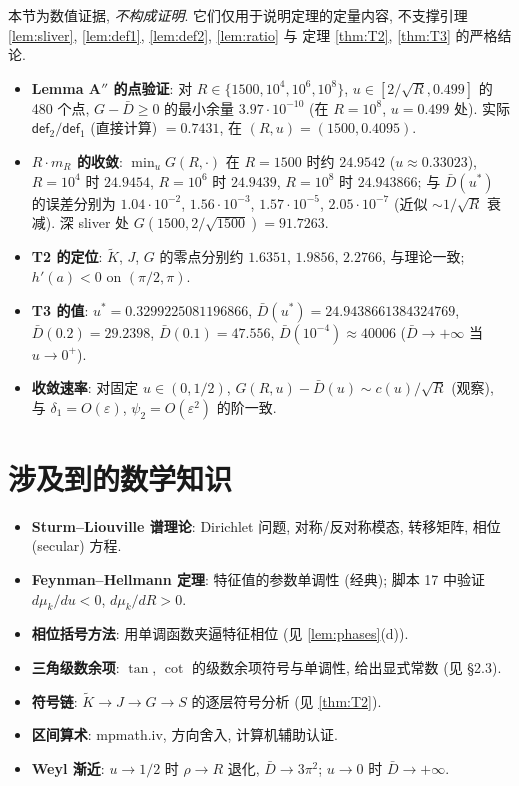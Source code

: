\documentclass[UTF8]{ctexart}
\begin{document}
本节为数值证据, \emph{不构成证明}. 它们仅用于说明定理的定量内容,
不支撑引理 \ref{lem:sliver}, \ref{lem:def1}, \ref{lem:def2}, \ref{lem:ratio} 与
定理 \ref{thm:T2}, \ref{thm:T3} 的严格结论.

\begin{itemize}
	\item \textbf{Lemma A$''$ 的点验证}: 对 $R\in\{1500,10^4,10^6,10^8\}$,
		$u\in[2/\sqrt R,0.499]$ 的 480 个点, $G-\bar D\ge0$ 的最小余量
		$3.97\cdot10^{-10}$ (在 $R=10^8$, $u=0.499$ 处). 实际
		$\mathsf{def}_2/\mathsf{def}_1$ (直接计算) $=0.7431$, 在 $(R,u)=(1500,0.4095)$.
	\item \textbf{$R\cdot m_R$ 的收敛}: $\min_u G(R,\cdot)$ 在 $R=1500$ 时约
		$24.9542$ ($u\approx0.33023$), $R=10^4$ 时 $24.9454$, $R=10^6$ 时 $24.9439$,
		$R=10^8$ 时 $24.943866$; 与 $\bar D(u^*)$ 的误差分别为 $1.04\cdot10^{-2}$,
		$1.56\cdot10^{-3}$, $1.57\cdot10^{-5}$, $2.05\cdot10^{-7}$
		(近似 $\sim1/\sqrt R$ 衰减). 深 sliver 处 $G(1500,2/\sqrt{1500})=91.7263$.
	\item \textbf{T2 的定位}: $\widetilde K$, $J$, $G$ 的零点分别约 $1.6351$, $1.9856$, $2.2766$,
		与理论一致; $h'(a)<0$ on $(\pi/2,\pi)$.
	\item \textbf{T3 的值}: $u^*=0.3299225081196866$, $\bar D(u^*)=24.9438661384324769$,
		$\bar D(0.2)=29.2398$, $\bar D(0.1)=47.556$, $\bar D(10^{-4})\approx40006$
		($\bar D\to+\infty$ 当 $u\to0^+$).
	\item \textbf{收敛速率}: 对固定 $u\in(0,1/2)$, $G(R,u)-\bar D(u)\sim c(u)/\sqrt R$
		(观察), 与 $\delta_1=O(\varepsilon)$, $\psi_2=O(\varepsilon^2)$ 的阶一致.
\end{itemize}

\section{涉及到的数学知识}
\begin{itemize}
	\item \textbf{Sturm--Liouville 谱理论}: Dirichlet 问题, 对称/反对称模态,
		转移矩阵, 相位 (secular) 方程.
	\item \textbf{Feynman--Hellmann 定理}: 特征值的参数单调性 (经典);
		脚本 17 中验证 $d\mu_k/du<0$, $d\mu_k/dR>0$.
	\item \textbf{相位括号方法}: 用单调函数夹逼特征相位 (见 \ref{lem:phases}(d)).
	\item \textbf{三角级数余项}: $\tan$, $\cot$ 的级数余项符号与单调性,
		给出显式常数 (见 §2.3).
	\item \textbf{符号链}: $\widetilde K\to J\to G\to S$ 的逐层符号分析
		(见 \ref{thm:T2}).
	\item \textbf{区间算术}: mpmath.iv, 方向舍入, 计算机辅助认证.
	\item \textbf{Weyl 渐近}: $u\to1/2$ 时 $\rho\to R$ 退化, $\bar D\to3\pi^2$;
		$u\to0$ 时 $\bar D\to+\infty$.
\end{itemize}
\end{document}
